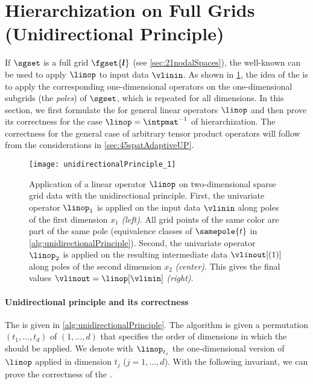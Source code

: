 \section{Hierarchization on Full Grids (Unidirectional Principle)}
\label{sec:42fullGrids}

If $\sgset$ is a full grid $\fgset{\*l}$
(see \cref{sec:21nodalSpaces}),
the well-known \emph{\up}
can be used to apply $\linop$ to input data $\vlinin$.
As shown in \cref{fig:unidirectionalPrinciple}, the idea of the \up
is to apply the corresponding one-dimensional operators on the
one-dimensional subgrids (the \emph{poles}) of $\sgset$,
which is repeated for all dimensions.
In this section, we first formulate the \up for
general linear operators $\linop$ and then prove its correctness for
the case $\linop = \intpmat^{-1}$ of hierarchization.
The correctness for the general case of arbitrary tensor product operators
will follow from the considerations in \cref{sec:45spatAdaptiveUP}.

\begin{figure}
  \texttt{[image: unidirectionalPrinciple\_1]}%
  \caption[%
    Unidirectional principle%
  ]{%
    Application of a linear operator $\linop$
    on two-dimensional sparse grid data with the unidirectional principle.
    First, the univariate operator $\linop_1$ is applied on
    the input data $\vlinin$
    along poles of the first dimension $x_1$ \emph{(left)}.
    All grid points of the same color are part of the same pole
    (equivalence classes of $\samepole{t}$ in
    \cref{alg:unidirectionalPrinciple}).
    Second, the univariate operator $\linop_2$ is applied on the
    resulting intermediate data $\vlinout[(1)]$
    along poles of the second dimension $x_2$ \emph{(center)}.
    This gives the final values $\vlinout = \linop[\vlinin]$ \emph{(right)}.%
  }%
  \label{fig:unidirectionalPrinciple}%
\end{figure}

\paragraph{Unidirectional principle and its correctness}

The \up is given in \cref{alg:unidirectionalPrinciple}.
The algorithm is given a permutation $(t_1, \dotsc, t_d)$ of $(1, \dotsc, d)$
that specifies the order of dimensions in which the \up should be applied.
We denote with $\linop_{t_j}$ the one-dimensional version of $\linop$
applied in dimension $t_j$ ($j = 1, \dotsc, d$).
With the following invariant, we can prove the correctness of the \up.

